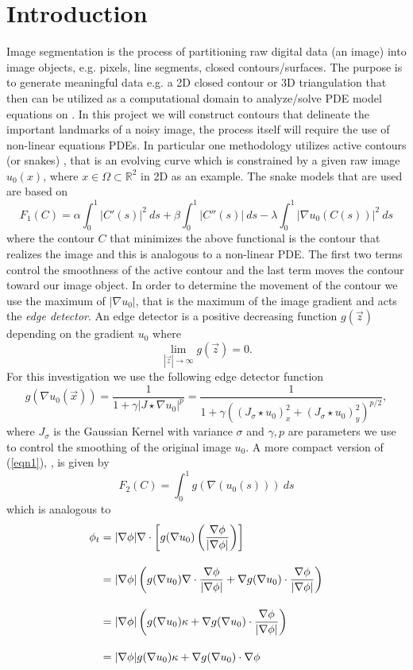 \documentclass[margin=1in,12pt,3p]{elsarticle}
\begin{document}
\section{Introduction}
Image segmentation is the process of partitioning raw digital data (an image) into image objects, e.g. pixels, line segments, closed contours/surfaces. The purpose is to generate meaningful data e.g. a 2D closed contour or 3D triangulation that then can be utilized as a computational domain to analyze/solve PDE model equations on \cite{computerVision}. In this project we will construct contours that delineate the important landmarks of a noisy image, the process itself will require the use of non-linear equations PDEs. In particular one methodology utilizes active contours (or snakes) \cite{osher2006level}, that is an evolving curve which is constrained by a given raw image $u_0(x)$, where $x\in\Omega\subset\mathbb{R}^2$ in 2D as an example. The snake models that are used \cite{osher2006level} are based on
\begin{equation}\label{eqn1}
F_1(C)=\alpha\int_0^1|C'(s)|^2\ ds + \beta\int_0^1|C''(s)|\ ds - \lambda\int_0^1|\nabla u_0(C(s))|^2\ ds
\end{equation}
where the contour $C$ that minimizes the above functional is the contour that realizes the image and this is analogous to a non-linear PDE. The first two terms control the smoothness of the active contour and the last term moves the contour toward our image object. In order to determine the movement of the contour we use the maximum of $|\nabla u_0|$, that is the maximum of the image gradient and acts the \textit{edge detector}. An edge detector is a positive decreasing function $g(\Vec{z})$ depending on the gradient $u_0$ where
\[
\lim_{|\Vec{z}|\rightarrow \infty}g(\vec{z}) = 0.
\]
For this investigation we use the following edge detector function
\begin{equation}\label{eqn2}
    g(\nabla u_0(\Vec{x}))=\frac{1}{1+\gamma|J\star \nabla u_0|^p}=\frac{1}{1+\gamma\left((J_\sigma\star u_0)_x^2+(J_\sigma\star u_0)_y^2\right)^{p/2}},
\end{equation}
where $J_\sigma$ is the Gaussian Kernel with variance $\sigma$ and $\gamma,p$ are parameters we use to control the smoothing of the original image $u_0$.
A more compact version of (\ref{eqn1}), \cite{osher2006level}, is given by
\[
F_2(C)=\int_0^1 g(\nabla(u_0(s)))\ ds
\]
which is analogous to
\begin{align}\label{eqn3}
\phi_t &= |\nabla\phi|\nabla\cdot\left[g(\nabla u_0) \left(\frac{\nabla\phi}{|\nabla\phi|}\right)\right]\notag \\[10pt]
&=|\nabla\phi|\left(g(\nabla u_0)\nabla\cdot\frac{\nabla\phi}{|\nabla\phi|}+\nabla g(\nabla u_0)\cdot\frac{\nabla\phi}{|\nabla\phi|} \right)\notag \\[10pt]
&=|\nabla\phi|\left(g(\nabla u_0)\kappa+\nabla g(\nabla u_0)\cdot\frac{\nabla\phi}{|\nabla\phi|} \right)\notag \\[10pt]
&=|\nabla\phi|g(\nabla u_0)\kappa+\nabla g(\nabla u_0)\cdot\nabla\phi
\end{align}
\end{document}
